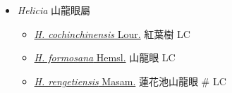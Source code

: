 
  \begin{itemize}
 \item[] \textit{Helicia} 山龍眼屬
                                
  \begin{itemize}
        \item[] \href{http://www.theplantlist.org/tpl1.1/search?q=Helicia+cochinchinensis}{\textit{H. cochinchinensis} Lour.}   紅葉樹   LC
        \item[] \href{http://www.theplantlist.org/tpl1.1/search?q=Helicia+formosana}{\textit{H. formosana} Hemsl.}   山龍眼   LC
        \item[] \href{http://www.theplantlist.org/tpl1.1/search?q=Helicia+rengetiensis}{\textit{H. rengetiensis} Masam.}   蓮花池山龍眼  \# LC
  \end{itemize}
  \end{itemize}
